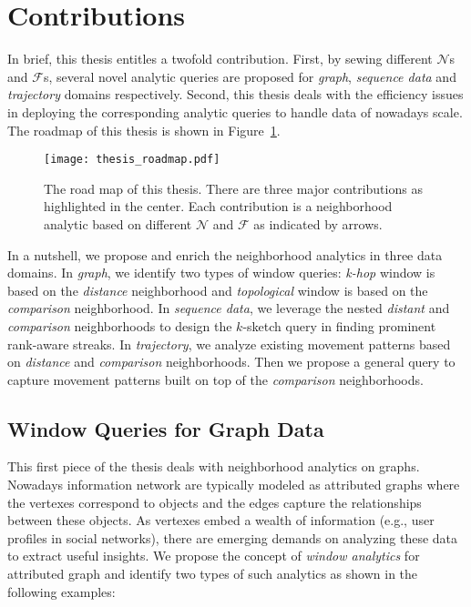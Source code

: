 \section{Contributions}
In brief, this thesis entitles a twofold contribution.
First, by sewing different $\mathcal{N}$s and $\mathcal{F}$s, 
several novel analytic queries are proposed for 
\emph{graph}, \emph{sequence data} and \emph{trajectory} domains respectively. 
Second, this thesis
deals with the efficiency issues in deploying the corresponding analytic queries to
handle data of nowadays scale.
The roadmap of this thesis is shown in Figure~\ref{fig:thesis_roadmap}.
\begin{figure}[h]
\centering
\texttt{[image: thesis\_roadmap.pdf]}
\caption{The road map of this thesis. There are three major contributions as highlighted in the center. Each contribution
is a neighborhood analytic based on different $\mathcal{N}$ and $\mathcal{F}$ as indicated by arrows.} 
\label{fig:thesis_roadmap}
\end{figure}

In a nutshell, we propose and enrich the neighborhood analytics in three data domains. 
In \emph{graph}, we identify two types
of window queries: \emph{k-hop} window is based on the \emph{distance} neighborhood
and \emph{topological} window is based on the \emph{comparison} neighborhood. 
In \emph{sequence data}, we leverage the nested \emph{distant} and \emph{comparison} neighborhoods 
to design the $k$-sketch query in finding prominent rank-aware streaks.
In \emph{trajectory}, we analyze existing movement patterns based
on \emph{distance} and \emph{comparison} neighborhoods. Then we propose a general query
to capture movement patterns built on top of the \emph{comparison} neighborhoods.

\subsection{Window Queries for Graph Data}
This first piece of the thesis deals with neighborhood analytics
on graphs. Nowadays information network are typically
modeled as attributed graphs where the 
vertexes correspond to objects and the edges capture the
relationships between these objects. As vertexes embed a wealth
of information (e.g., user profiles in social networks), there are 
emerging demands on analyzing these data to extract useful insights. 
We propose the concept of \emph{window analytics} 
for attributed graph and identify two types of such analytics as shown in the following examples:

